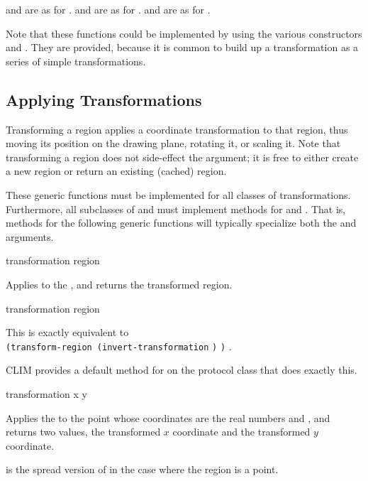  and  are as for .
 and  are as for .
 and  are as for .

Note that these functions could be implemented by using the various constructors
and .  They are provided, because it is common to
build up a transformation as a series of simple transformations.


\subsection {Applying Transformations}

Transforming a region applies a coordinate transformation to that region, thus
moving its position on the drawing plane, rotating it, or scaling it.  Note that
transforming a region does not side-effect the  argument; it is free
to either create a new region or return an existing (cached) region.

These generic functions must be implemented for all classes of transformations.
Furthermore, all subclasses of  and  must implement
methods for  and .  That is, methods
for the following generic functions will typically specialize both the
 and  arguments.

 {transformation region}

Applies  to the  , and returns the
transformed region.

 {transformation region}

This is exactly equivalent to \\
\verb+(transform-region (invert-transformation+ \verb+)+
\verb+)+ .

CLIM provides a default method for  on the
 protocol class that does exactly this.


 {transformation x y}

Applies the   to the point whose
coordinates are the real numbers  and , and returns two values,
the transformed $x$ coordinate and the transformed $y$ coordinate.

 is the spread version of  in the
case where the region is a point.

